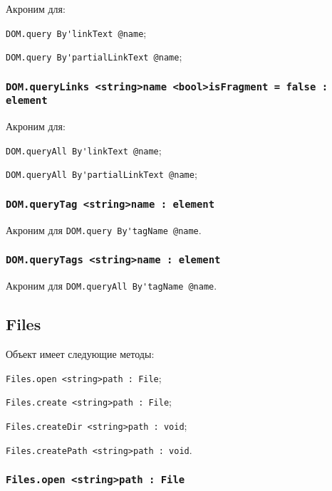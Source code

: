 Акроним для:
\begin{icItems}
	\item \lstinline|DOM.query By'linkText @name|;
	\item \lstinline|DOM.query By'partialLinkText @name|;
\end{icItems}

\subsubsection{\lstinline|DOM.queryLinks <string>name <bool>isFragment = false : element|}

Акроним для:
\begin{icItems}
	\item \lstinline|DOM.queryAll By'linkText @name|;
	\item \lstinline|DOM.queryAll By'partialLinkText @name|;
\end{icItems}

\subsubsection{\lstinline|DOM.queryTag <string>name : element|}

Акроним для \lstinline|DOM.query By'tagName @name|.

\subsubsection{\lstinline|DOM.queryTags <string>name : element|}

Акроним для \lstinline|DOM.queryAll By'tagName @name|.

\subsection{{\color{orange} Files}}

Объект \files{} имеет следующие методы:
\begin{icItems}
	\item \lstinline|Files.open <string>path : File|;
	\item \lstinline|Files.create <string>path : File|;
	\item \lstinline|Files.createDir <string>path : void|;
	\item \lstinline|Files.createPath <string>path : void|.
\end{icItems}

\subsubsection{\lstinline|Files.open <string>path : File|}

